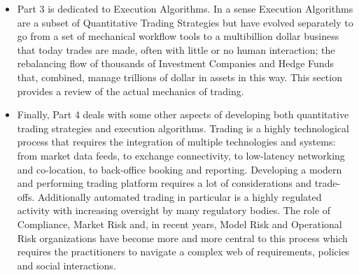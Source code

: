 \begin{itemize}
\item Part 3 is dedicated to Execution Algorithms. In a sense Execution Algorithms are a subset of Quantitative Trading Strategies but have evolved separately to go from a set of mechanical workflow tools to a multibillion dollar business that today trades are made, often with little or no human interaction; the rebalancing flow of thousands of Investment Companies and Hedge Funds that, combined, manage trillions of dollar in assets in this way. This section provides a review of the actual mechanics of trading. 

\item Finally, Part 4 deals with some other aspects of developing both quantitative trading strategies and execution algorithms. Trading is a highly technological process that requires the integration of multiple technologies and systems: from market data feeds, to exchange connectivity, to low-latency networking and co-location, to back-office booking and reporting. Developing a modern and performing trading platform requires a lot of considerations and trade-offs. Additionally automated trading in particular is a highly regulated activity with increasing oversight by many regulatory bodies. The role of Compliance, Market Risk and, in recent years, Model Risk and Operational Risk organizations have become more and more central to this process which requires the practitioners to navigate a  complex web of requirements, policies and social interactions.
\end{itemize}


